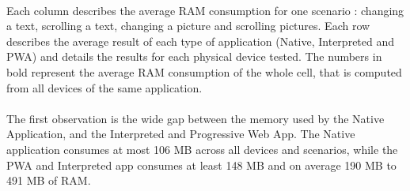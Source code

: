 \documentclass{kththesis}
\begin{document}
\begin{table}[h]
    \centering
    
    \caption{Average RAM consumption (MB)}
    \label{tab:memory}
\end{table}

\paragraph{}
Each column describes the average RAM consumption for one scenario : changing a text, scrolling a text, changing a picture and scrolling pictures. Each row describes the average result of each type of application (Native, Interpreted and PWA) and details the results for each physical device tested. The numbers in bold represent the average RAM consumption of the whole cell, that is computed from all devices of the same application.

\paragraph{}
The first observation is the wide gap between the memory used by the Native Application, and the Interpreted and Progressive Web App. The Native application consumes at most 106 MB across all devices and scenarios, while the PWA and Interpreted app consumes at least 148 MB and on average 190 MB to 491 MB of RAM.
\end{document}
